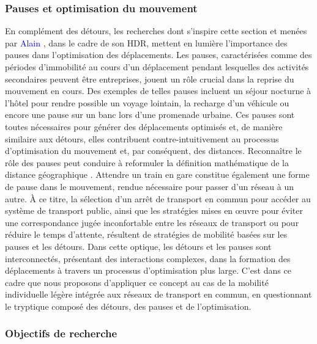 \begin{refsegment}
\subsubsection*{Pauses et optimisation du mouvement
    \label{chap5:pauses-optimisation}
    }
    
En complément des détours, les recherches dont s'inspire cette section et menées par \textcolor{blue}{Alain} \textcolor{blue}{\textcite[447]{lhostis_detour_2017}}, dans le cadre de son \acrfull{HDR}, mettent en lumière l'importance des pauses dans l'optimisation des déplacements. Les pauses, caractérisées comme des périodes d'immobilité au cours d'un déplacement pendant lesquelles des activités secondaires peuvent être entreprises, jouent un rôle crucial dans la reprise du mouvement en cours. Des exemples de telles pauses incluent un séjour nocturne à l'hôtel pour rendre possible un voyage lointain, la recharge d'un véhicule ou encore une pause sur un banc lors d'une promenade urbaine. Ces pauses sont toutes nécessaires pour générer des déplacements optimisés et, de manière similaire aux détours, elles contribuent contre-intuitivement au processus d'optimisation du mouvement et, par conséquent, des distances. Reconnaître le rôle des pauses peut conduire à reformuler la définition mathématique de la distance géographique \textcolor{blue}{\autocite[12]{kloeckner_metrics_2023}}. Attendre un train en gare constitue également une forme de pause dans le mouvement, rendue nécessaire pour passer d'un réseau à un autre. À ce titre, la sélection d'un arrêt de transport en commun pour accéder au système de transport public, ainsi que les stratégies mises en œuvre pour éviter une correspondance jugée inconfortable entre les réseaux de transport ou pour réduire le temps d'attente, résultent de stratégies de mobilité basées sur les pauses et les détours. Dans cette optique, les détours et les pauses sont interconnectés, présentant des interactions complexes, dans la formation des déplacements à travers un processus d'optimisation plus large. C'est dans ce cadre que nous proposons d'appliquer ce concept au cas de la mobilité individuelle légère intégrée aux réseaux de transport en commun, en questionnant le tryptique composé des détours, des pauses et de l'optimisation.%

\subsubsection*{Objectifs de recherche
    \label{chap5:objectifs-recherche}
    }
    

\end{refsegment}
